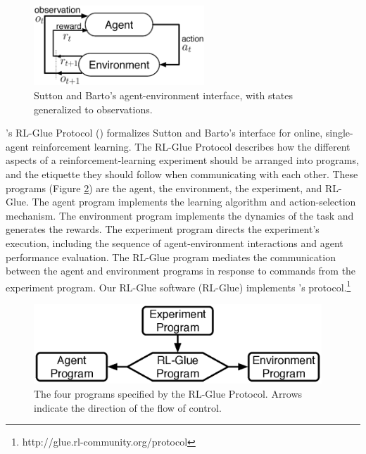 \documentclass[twoside,11pt]{article}
\begin{document}
\vspace{-0.3cm}
\begin{figure}[ht]
\begin{center}
\includegraphics[height=3cm]{figures/agent-env.eps}
\vspace{-0.4cm}
\caption{\small Sutton and Barto's agent-environment interface, with states generalized to observations.}
\label{fig:agent-env}
\end{center}
\end{figure}


\citeauthor{whiteThesis}'s RL-Glue Protocol (\citeyear{whiteThesis}) formalizes Sutton and Barto's interface for online, single-agent reinforcement learning.  The RL-Glue Protocol describes how the different aspects of a reinforcement-learning experiment should be arranged into programs, and the etiquette they should follow when communicating with each other. These programs (Figure \ref{fig:RLDIA}) are the agent, the environment, the experiment, and RL-Glue.  The agent program implements the learning algorithm and action-selection mechanism. The environment program implements the dynamics of the task and generates the rewards. The experiment program directs the experiment's execution, including the sequence of agent-environment interactions and agent performance evaluation.  The RL-Glue program mediates the communication between the agent and environment programs in response to commands from the experiment program. Our RL-Glue software (RL-Glue) implements \citeauthor{whiteThesis}'s protocol.\footnote{http://glue.rl-community.org/protocol} 

\vspace{-0.3cm}
\begin{figure}[ht]
\begin{center}
\includegraphics[height=3cm]{figures/glue.eps}
\vspace{-0.4cm}
\caption{\small The four programs specified by the RL-Glue Protocol.  Arrows indicate the direction of the flow of control.}
\label{fig:RLDIA}
\end{center}
\end{figure}
\end{document}
